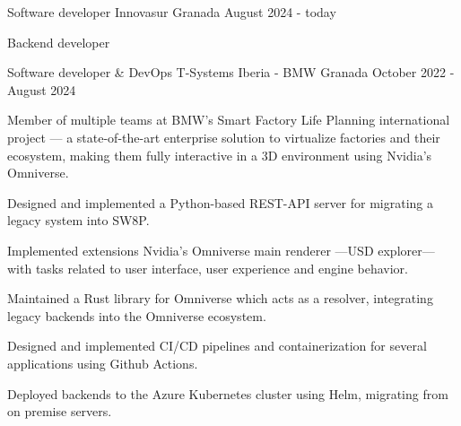 
\begin{cventries}
  \cventry
  	{Software developer}
  	{Innovasur}
  	{Granada}
  	{August 2024 - today}
  	{
  		\begin{cvitems}
			\item {Backend developer} 
  		\end{cvitems}
  	}
  \cventry
    {Software developer \& DevOps} %
    {T-Systems Iberia - BMW} %
    {Granada} %
    {October 2022 - August 2024} %
    {
      \begin{cvitems} %
        \item {Member of multiple teams at BMW's Smart Factory Life Planning international project — a state-of-the-art enterprise solution to virtualize factories and their ecosystem, making them fully interactive in a 3D environment using Nvidia's Omniverse.}
        \item {Designed and implemented a Python-based REST-API server for migrating a legacy system into SW8P.}
        \item {Implemented extensions Nvidia's Omniverse main renderer —USD explorer— with tasks related to user interface, user experience and engine behavior.}
        \item {Maintained a Rust library for Omniverse which acts as a resolver, integrating legacy backends into the Omniverse ecosystem.}
        \item {Designed and implemented CI/CD pipelines and containerization for several applications using Github Actions.}
        \item {Deployed backends to the Azure Kubernetes cluster using Helm, migrating from on premise servers.}
      \end{cvitems}
    }
\end{cventries}
